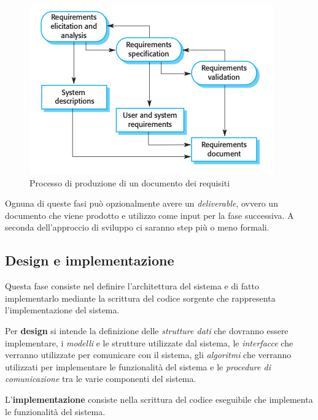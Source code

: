 \begin{figure}[H]
  \centering
  \includegraphics[scale=0.5]{img/requisitifasi.png}
  \caption{Processo di produzione di un documento dei requisiti}
\end{figure}
Ognuna di queste fasi può opzionalmente avere un \textit{deliverable}, ovvero un
documento che viene prodotto e utilizzo come input per la fase successiva.
A seconda dell'approccio di sviluppo ci saranno step più o meno formali.
\subsection{Design e implementazione}
Questa fase consiste nel definire l'architettura del sistema e di fatto implementarlo
mediante la scrittura del codice sorgente che rappresenta l'implementazione del sistema.

Per \textbf{design} si intende la definizione delle \textit{strutture dati} che dovranno essere 
implementare, i \textit{modelli} e le strutture utilizzate dal sistema, le \textit{interfacce} 
che verranno utilizzate per comunicare con il sistema, gli \textit{algoritmi} che verranno utilizzati
per implementare le funzionalità del sistema e le \textit{procedure di comunicazione} tra le varie
componenti del sistema.

L'\textbf{implementazione} consiste nella scrittura del codice eseguibile che implementa
le funzionalità del sistema.

